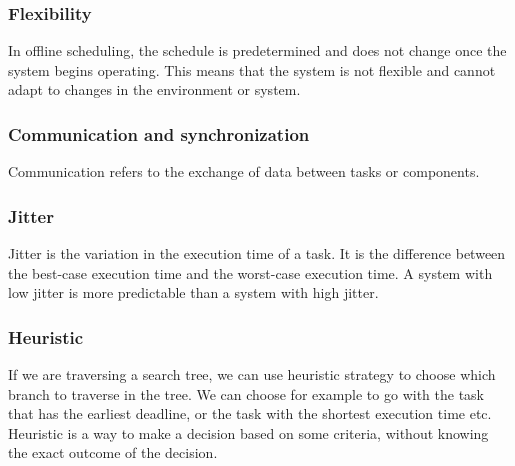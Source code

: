             \subsubsection{Flexibility}
            In offline scheduling, the schedule is predetermined and does not change once the system begins operating. This means that the system is not flexible and cannot adapt to changes in the environment or system.

            \subsubsection{Communication and synchronization}
            Communication refers to the exchange of data between tasks or components. 

            \subsubsection{Jitter}
            Jitter is the variation in the execution time of a task. It is the difference between the best-case execution time and the worst-case execution time. A system with low jitter is more predictable than a system with high jitter.

            \subsubsection{Heuristic}
            If we are traversing a search tree, we can use heuristic strategy to choose which branch to traverse in the tree. We can choose for example to go with the task that has the earliest deadline, or the task with the shortest execution time etc. Heuristic is a way to make a decision based on some criteria, without knowing the exact outcome of the decision. 